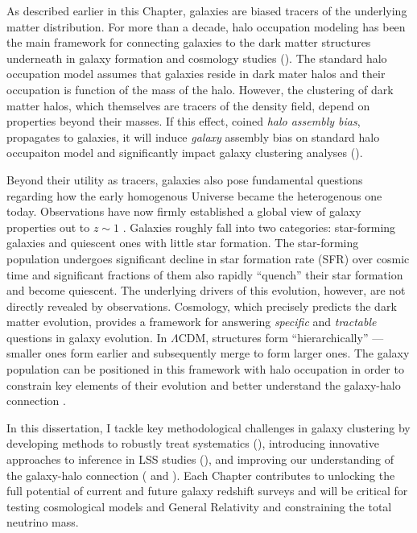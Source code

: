 As described earlier in this Chapter, galaxies are biased tracers of the 
underlying matter distribution. For more than a decade, halo occupation 
modeling has been the main framework for connecting galaxies
to the dark matter structures underneath in galaxy formation and cosmology
studies (). The standard halo occupation model
assumes that galaxies reside in dark mater halos and their occupation 
is function of the mass of the halo. However, the clustering of dark 
matter halos, which themselves are tracers of the density field, 
depend on properties beyond their masses. If this effect, coined 
{\em halo assembly bias}, propagates to galaxies, it will induce 
{\em galaxy} assembly bias on standard halo occupaiton model and 
significantly impact galaxy clustering analyses (). 

Beyond their utility as tracers, galaxies also pose fundamental 
questions regarding how the early homogenous Universe became the heterogenous 
one today. Observations have now firmly established a global view of galaxy 
properties out to $z\sim1$ \citep[\emph{e.g.}][]{Blanton:2009aa, Moustakas:2013aa}.
Galaxies roughly fall into two categories: star-forming galaxies and 
quiescent ones with little star formation. The star-forming population 
undergoes significant decline in star formation rate (SFR) over cosmic 
time and significant fractions of them also rapidly ``quench'' their 
star formation and become quiescent. The underlying drivers of this 
evolution, however, are not directly revealed by observations.
Cosmology, which precisely predicts the dark matter evolution, provides 
a framework for answering {\em specific} and {\em tractable} questions 
in galaxy evolution.  In $\Lambda$CDM, structures form 
``hierarchically'' --- smaller ones form earlier and subsequently 
merge to form larger ones. The galaxy population can be positioned in 
this framework with halo occupation in order to constrain key elements 
of their evolution and better understand the galaxy-halo connection 
\citep[][]{Wetzel:2013aa}. 

In this dissertation, I tackle key methodological challenges in 
galaxy clustering by developing methods to robustly treat systematics (), 
introducing innovative approaches to inference in LSS studies (), and 
improving our understanding of the galaxy-halo connection 
( and ). Each Chapter contributes to unlocking 
the full potential of current and future galaxy redshift surveys and will be
critical for testing cosmological models and General Relativity and 
constraining the total neutrino mass. 

